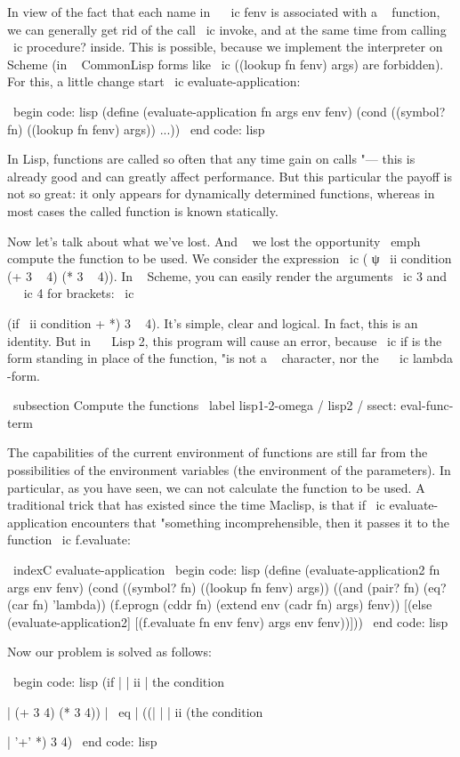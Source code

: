 {In view of the fact that each name in ~ \ ic {fenv} is associated with a ~ function, we can generally
get rid of the call \ ic {invoke}, and at the same time from calling \ ic {procedure?} inside.
This is possible, because we implement the interpreter on Scheme (in ~ { CommonLisp }
forms like \ ic {((lookup fn fenv) args)} are forbidden). For this, a little
change start \ ic {evaluate-application}:

\ begin {code: lisp}
(define (evaluate-application fn args env fenv)
  (cond ((symbol? fn) ((lookup fn fenv) args))
        ...))
\ end {code: lisp}

In Lisp, functions are called so often that any time gain on calls "---
this is already good and can greatly affect performance. But this particular
the payoff is not so great: it only appears for dynamically determined
functions, whereas in most cases the called function is known statically.

Now let's talk about what we've lost. And ~ we lost the opportunity
\ emph {compute} the function to be used. We consider the expression \ ic {( ψ \ ii {condition}
(+ 3 ~ 4) (* 3 ~ 4))}. In ~ Scheme, you can easily render the arguments \ ic {3} and ~ \ ic {4} for
brackets: \ ic {({if \ ii {condition} + *) 3 ~ 4)}. It's simple, clear and logical.
In fact, this is an identity. But in ~ \ Lisp 2, this program will cause an error, because
\ ic {if} is the form standing in place of the function, "is not a ~ character,
nor the ~ \ ic {lambda} -form.


\ subsection {Compute the functions} \ label {lisp1-2-omega / lisp2 / ssect: eval-func-term}

The capabilities of the current environment of functions are still far from the possibilities of the environment
variables (the environment of the parameters). In particular, as you have seen, we can not
calculate the function to be used. A traditional trick that has existed since the time
Maclisp, is that if \ ic {evaluate-application} encounters
that "something incomprehensible, then it passes it to the function \ ic {f.evaluate}:

\ indexC {evaluate-application}
\ begin {code: lisp}
(define (evaluate-application2 fn args env fenv)
  (cond ((symbol? fn)
         ((lookup fn fenv) args))
        ((and (pair? fn) (eq? (car fn) 'lambda))
         (f.eprogn (cddr fn)
                   (extend env (cadr fn) args)
                   fenv))
        [(else (evaluate-application2]
               [(f.evaluate fn env fenv) args env fenv))]))
\ end {code: lisp}

Now our problem is solved as follows:

\ begin {code: lisp}
(if | | ii | the condition} | (+ 3 4) (* 3 4)) | \ eq | ((| | | ii (the condition} | '+' *) 3 4)
\ end {code: lisp}

